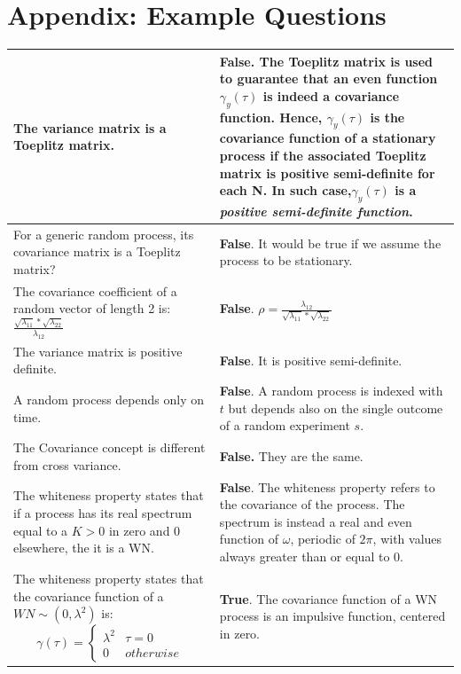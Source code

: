 \documentclass[10pt,a4paper]{article}
\begin{document}
\section{Appendix: Example Questions}
\begin{center}
\begin{tabular}{ | m{200pt} | m{200pt}| }
\hline
 The variance matrix is a Toeplitz matrix. & \textbf{False}. The Toeplitz matrix is used to guarantee that an even function $\gamma_y(\tau)$ is indeed a covariance function. Hence, $\gamma_y(\tau)$ is the covariance function of a stationary process if the associated Toeplitz matrix is positive semi-definite for each N. In such case,$\gamma_y(\tau)$ is a \textit{positive semi-definite function}. \\
 \hline
 For a generic random process, its covariance matrix is a Toeplitz matrix? & \textbf{False}. It would be true if we assume the process to be stationary. \\ 
 \hline 
 The covariance coefficient of a random vector of length 2 is:
$\frac{\sqrt{\lambda_{11}}*\sqrt{\lambda_{22}}}{\lambda_{12}}$ & \textbf{False}. $\rho=\frac{\lambda_{12}}{\sqrt{\lambda_{11}}*\sqrt{\lambda_{22}}}$ \\
\hline
The variance matrix is positive definite. & \textbf{False}. It is positive semi-definite.
\\ \hline
A random process depends only on time. & \textbf{False}. A random process is indexed with $t$ but depends also on the single outcome of a random experiment $s$.
\\ \hline
The Covariance concept is different from cross variance. & \textbf{False.} They are the same.
\\ \hline
The whiteness property states that if a process has its real spectrum equal to a $K>0$ in zero and $0$ elsewhere, the it is a WN. & \textbf{False}. The whiteness property refers to the covariance of the process. The spectrum is instead a real and even function of $\omega$, periodic of $2\pi$, with values always greater than or equal to 0.
\\ \hline
The whiteness property states that the covariance function of a $WN \sim (0,\lambda^2)$ is:
\begin{equation*}
  		\gamma(\tau) =
    		\begin{cases}
      			\lambda^2 & \tau = 0 \\
      			0 & otherwise
    \end{cases}  
\end{equation*} & \textbf{True}. The covariance function of a WN process is an impulsive function, centered in zero.

\end{tabular}
\end{center}
\end{document}
